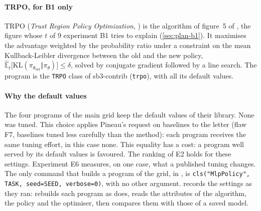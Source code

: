 \paragraph{TRPO, for B1 only}
TRPO (\emph{Trust Region Policy Optimization}, \cite{schulman2015trpo}) is the algorithm of figure~5 of
\textcite{henderson2018matters}, the figure whose $t$ of 9 experiment B1 tries to explain
(\cref{sec:plan-b1}). It maximises the advantage weighted by the probability ratio under a constraint on the
mean Kullback-Leibler divergence between the old and the new policy,
$\hat{\mathbb{E}}_t\bigl[\mathrm{KL}(\pi_{\theta_{\text{old}}}\Vert\pi_\theta)\bigr] \le \delta$, solved by
conjugate gradient followed by a line search. The program is the \texttt{TRPO} class of sb3-contrib
(\texttt{trpo}), with all its default values.

\paragraph{Why the default values}
The four programs of the main grid keep the default values of their library. None was tuned. This choice
applies Pineau's request on baselines to the letter (flaw F7, baselines tuned less carefully than the method):
each program receives the same tuning effort, in this case none. This equality has a cost: a program well
served by its default values is favoured. The ranking of E2 holds for these settings. Experiment E6 measures, on one
case, what a published tuning changes. The only command that builds a program of the grid, in
, is \texttt{cls("MlpPolicy", TASK, seed=SEED, verbose=0)}, with no other argument.
 records the settings as they ran:  rebuilds each
program as  does, reads the attributes of the algorithm, the policy and the optimiser, then
compares them with those of a saved model.


